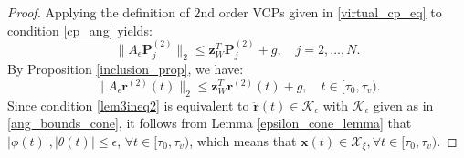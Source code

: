\documentclass[journal,10pt]{IEEEtran}
\newcommand{\vect}[1]{\boldsymbol{\mathbf{#1}}}
\newif\ifdraft
\newcommand{\XX}[1]{\ifdraft{\color{red}[{\bf XX}: #1]}\fi}
\newcommand{\VF}[1]{\ifdraft{\color{blue}[{\bf VF}: #1]}\fi}
\begin{document}
\begin{proof} Applying the definition of $2$nd order VCPs given in \eqref{virtual_cp_eq} to condition \eqref{cp_ang} yields:
\begin{equation} \label{vcp_ang}
\|A_{\epsilon}\vect{P}_j^{(2)}\|_2 \leq \vect{z}_W^T\vect{P}_j^{(2)}+g, \quad j=2,\dots,N.
\end{equation}
By Proposition \ref{inclusion_prop}, we have:
\begin{equation}\label{lem3ineq2}
    \|A_{\epsilon}\vect{r}^{(2)}(t)\|_2\leq \vect{z}_W^T\vect{r}^{(2)}(t) + g, \quad t\in[\tau_0,\tau_v).
\end{equation}
Since condition \eqref{lem3ineq2} is equivalent to $\ddot{\vect{r}}(t)\in\mathcal{K}_{\epsilon}$ with $\mathcal{K}_{\epsilon}$ given as in \eqref{ang_bounds_cone}, it follows from Lemma \ref{epsilon_cone_lemma} that $|\phi(t)|,|\theta(t)|\leq \epsilon$, $\forall t\in[\tau_0,\tau_v)$, which means that $\vect{x}(t)\in\mathcal{X}_{\xi}, \forall  t\in[\tau_0,\tau_v)$.
\end{proof} 
\end{document}
